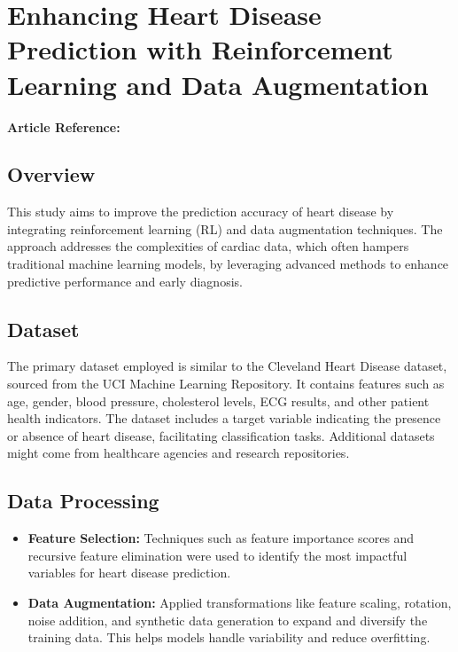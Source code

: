 

\section{Enhancing Heart Disease Prediction with Reinforcement Learning and Data Augmentation}
\textbf{Article Reference:} \cite{gayathriEnhancingHeartDisease2024}

\subsection*{Overview}
This study aims to improve the prediction accuracy of heart disease by integrating reinforcement learning (RL) and data augmentation techniques. The approach addresses the complexities of cardiac data, which often hampers traditional machine learning models, by leveraging advanced methods to enhance predictive performance and early diagnosis.

\subsection*{Dataset}
The primary dataset employed is similar to the Cleveland Heart Disease dataset, sourced from the UCI Machine Learning Repository. It contains features such as age, gender, blood pressure, cholesterol levels, ECG results, and other patient health indicators. The dataset includes a target variable indicating the presence or absence of heart disease, facilitating classification tasks. Additional datasets might come from healthcare agencies and research repositories.

\subsection*{Data Processing}
\begin{itemize}
    \item \textbf{Feature Selection:} Techniques such as feature importance scores and recursive feature elimination were used to identify the most impactful variables for heart disease prediction.
    \item \textbf{Data Augmentation:} Applied transformations like feature scaling, rotation, noise addition, and synthetic data generation to expand and diversify the training data. This helps models handle variability and reduce overfitting.
\end{itemize}

